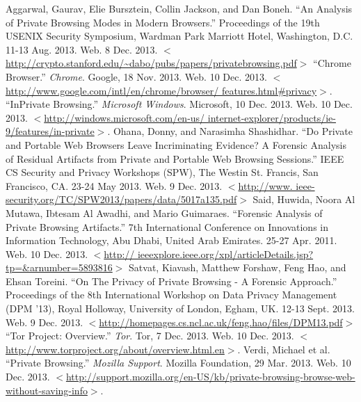 \documentclass[pdftex,letterpaper,titlepage,12pt]{article}
\begin{document}
  \singlespacing
  \begin{thebibliography}{9}
      Aggarwal, Gaurav, Elie Bursztein, Collin Jackson, and Dan Boneh.
      ``An Analysis of Private Browsing Modes in Modern Browsers.''
      Proceedings of the 19th USENIX Security Symposium,  Wardman Park Marriott
      Hotel, Washington, D.C. 11-13 Aug. 2013. Web. 8 Dec. 2013. $<$
      \url{http://crypto.stanford.edu/~dabo/pubs/papers/privatebrowsing.pdf}$>$
      ``Chrome Browser.'' \emph{Chrome}. Google, 18 Nov. 2013. Web. 10 Dec. 
      2013. $<$\url{http://www.google.com/intl/en/chrome/browser/
      features.html#privacy}$>$.
      ``InPrivate Browsing.'' \emph{Microsoft Windows}. Microsoft, 10 Dec. 
      2013. Web. 10 Dec. 2013. $<$\url{http://windows.microsoft.com/en-us/
      internet-explorer/products/ie-9/features/in-private}$>$.
      Ohana, Donny, and Narasimha Shashidhar. ``Do Private and Portable Web 
      Browsers Leave Incriminating Evidence? A Forensic Analysis of Residual 
      Artifacts from Private and Portable Web Browsing Sessions.'' IEEE CS 
      Security and Privacy Workshops (SPW), The Westin St. Francis, 
      San Francisco, CA. 23-24 May 2013. Web. 9 Dec. 2013. $<$\url{http://www.
      ieee-security.org/TC/SPW2013/papers/data/5017a135.pdf}$>$
      Said, Huwida, Noora Al Mutawa, Ibtesam Al Awadhi, and Mario Guimaraes.
      ``Forensic Analysis of Private Browsing Artifacts.'' 7th International
      Conference on Innovations in Information Technology, Abu Dhabi, United
      Arab Emirates. 25-27 Apr. 2011. Web. 10 Dec. 2013. $<$\url{http://
      ieeexplore.ieee.org/xpl/articleDetails.jsp?tp=&arnumber=5893816}$>$ 
      Satvat, Kiavash, Matthew Forshaw, Feng Hao, and Ehsan Toreini. ``On The 
      Privacy of Private Browsing - A Forensic Approach.'' Proceedings of the 
      8th International Workshop on Data Privacy Management (DPM '13), Royal 
      Holloway, University of London, Egham, UK. 12-13 Sept. 2013. Web. 9 Dec.
      2013. $<$\url{http://homepages.cs.ncl.ac.uk/feng.hao/files/DPM13.pdf}$>$ 
      ``Tor Project: Overview.'' \emph{Tor}. Tor, 7 Dec. 2013. Web. 10 Dec. 
      2013. $<$\url{http://www.torproject.org/about/overview.html.en}$>$. 
      Verdi, Michael et al. ``Private Browsing.'' \emph{Mozilla Support}. 
      Mozilla Foundation, 29 Mar. 2013. Web. 10 Dec. 2013. 
      $<$\url{http://support.mozilla.org/en-US/kb/private-browsing-browse-web-
      without-saving-info}$>$.
  \end{thebibliography}
\end{document}
